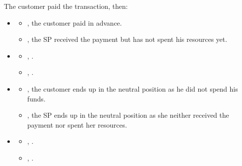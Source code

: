 \documentclass[pdftex,twocolumn,epjc3]{svjour3}
\begin{document}
{The customer paid the transaction, then:

\begin{itemize}
\item \AgreeablePath
  \begin{itemize}
    \item {}, the customer paid in advance.
    \item {}, the SP received the payment but has not spent his resources yet.
  \end{itemize}
\item \DisputePath
  \begin{itemize}
    \item {}, \CustomerLosesBeforePoP{}.
    \item {}, .
  \end{itemize}
\end{itemize}

\ActedAbnormallyThen{\customer}

\begin{itemize}
\item \AgreeablePath
  \begin{itemize}
    \item {}, the customer ends up in the neutral position as he did not spend his funds.
    \item {}, the SP ends up in the neutral position as she neither received the payment nor spent her resources.
  \end{itemize}
\item \DisputePath
  \begin{itemize}
    \item {}, \CustomerLosesBeforePayment{}.
    \item {}, .
  \end{itemize}
\end{itemize}

\Fairness

\newcommand{\CustomerRiskTemporaryDisadvantagedPosition}[1]{The customer, following the 9th assumption described in Section~\ref{sec:assumptions}, risk the temporary disadvantaged position #1 in favor of a later better position \Pos{9}{s}{\normal}{\plus}; meanwhile being able to get out of the disadvantaged position if the SP misbehave in one of the following steps.}

}
\end{document}
